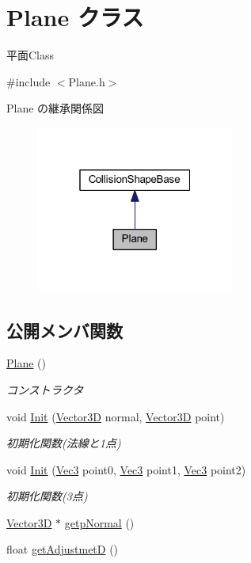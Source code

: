 \hypertarget{class_plane}{}\section{Plane クラス}
\label{class_plane}


平面\+Class  




{\ttfamily \#include $<$Plane.\+h$>$}



Plane の継承関係図\nopagebreak
\begin{figure}[H]
\begin{center}
\leavevmode
\includegraphics[width=184pt]{class_plane__inherit__graph}
\end{center}
\end{figure}
\subsection*{公開メンバ関数}
\begin{DoxyCompactItemize}
\item 
\mbox{\hyperlink{class_plane_acac0d9c003e0ab10d07b146c3566a0c7}{Plane}} ()
\begin{DoxyCompactList}\small\item\em コンストラクタ \end{DoxyCompactList}\item 
void \mbox{\hyperlink{class_plane_a2182719af8f880a3871be4cfc33a969b}{Init}} (\mbox{\hyperlink{class_vector3_d}{Vector3D}} normal, \mbox{\hyperlink{class_vector3_d}{Vector3D}} point)
\begin{DoxyCompactList}\small\item\em 初期化関数(法線と1点) \end{DoxyCompactList}\item 
void \mbox{\hyperlink{class_plane_ae50b8a5b6e6e7db1b0bdd5c6df515848}{Init}} (\mbox{\hyperlink{_vector3_d_8h_ab16f59e4393f29a01ec8b9bbbabbe65d}{Vec3}} point0, \mbox{\hyperlink{_vector3_d_8h_ab16f59e4393f29a01ec8b9bbbabbe65d}{Vec3}} point1, \mbox{\hyperlink{_vector3_d_8h_ab16f59e4393f29a01ec8b9bbbabbe65d}{Vec3}} point2)
\begin{DoxyCompactList}\small\item\em 初期化関数(3点) \end{DoxyCompactList}\item 
\mbox{\hyperlink{class_vector3_d}{Vector3D}} $\ast$ \mbox{\hyperlink{class_plane_a426c05b5e1d2f12562ac562333863ebb}{getp\+Normal}} ()
\item 
float \mbox{\hyperlink{class_plane_a66c47e8798df166c458ca215ed115684}{get\+AdjustmetD}} ()
\end{DoxyCompactItemize}
